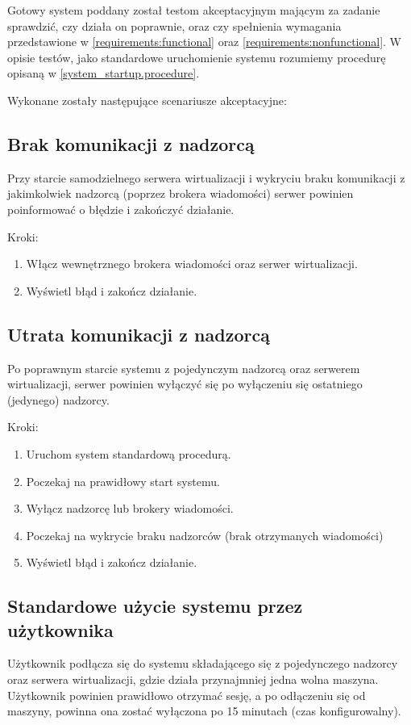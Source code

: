 \documentclass[../analiza-rozwiazania.tex]{subfiles}
\begin{document}
Gotowy system poddany został testom akceptacyjnym mającym za zadanie sprawdzić, czy działa on poprawnie, oraz czy spełnienia wymagania przedstawione w \ref{requirements:functional} oraz \ref{requirements:nonfunctional}.
W opisie testów, jako standardowe uruchomienie systemu rozumiemy procedurę opisaną w \ref{system_startup.procedure}.

Wykonane zostały następujące scenariusze akceptacyjne:

\subsection{Brak komunikacji z nadzorcą}
Przy starcie samodzielnego serwera wirtualizacji i wykryciu braku komunikacji z jakimkolwiek nadzorcą (poprzez brokera wiadomości) serwer powinien poinformować o błędzie i zakończyć działanie.

Kroki:
\begin{enumerate}
  \item Włącz wewnętrznego brokera wiadomości oraz serwer wirtualizacji.
  \item Wyświetl błąd i zakończ działanie.
\end{enumerate}

\subsection{Utrata komunikacji z nadzorcą}
Po poprawnym starcie systemu z pojedynczym nadzorcą oraz serwerem wirtualizacji, serwer powinien wyłączyć się po wyłączeniu się ostatniego (jedynego) nadzorcy.

Kroki:
\begin{enumerate}
  \item Uruchom system standardową procedurą.
  \item Poczekaj na prawidłowy start systemu.
  \item Wyłącz nadzorcę lub brokery wiadomości.
  \item Poczekaj na wykrycie braku nadzorców (brak otrzymanych wiadomości)
  \item Wyświetl błąd i zakończ działanie.
\end{enumerate}

\subsection{Standardowe użycie systemu przez użytkownika}
Użytkownik podłącza się do systemu składającego się z pojedynczego nadzorcy oraz serwera wirtualizacji, gdzie działa przynajmniej jedna wolna maszyna.
Użytkownik powinien prawidłowo otrzymać sesję, a po odłączeniu się od maszyny, powinna ona zostać wyłączona po 15 minutach (czas konfigurowalny).
\end{document}
